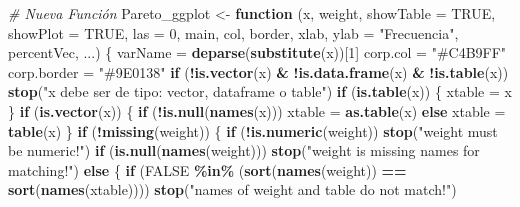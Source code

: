 \documentclass[
]{book}
\newenvironment{Shaded}{\begin{snugshade}}{\end{snugshade}}
\newcommand{\AttributeTok}[1]{\textcolor[rgb]{0.13,0.29,0.53}{#1}}
\newcommand{\CommentTok}[1]{\textcolor[rgb]{0.56,0.35,0.01}{\textit{#1}}}
\newcommand{\ConstantTok}[1]{\textcolor[rgb]{0.56,0.35,0.01}{#1}}
\newcommand{\ControlFlowTok}[1]{\textcolor[rgb]{0.13,0.29,0.53}{\textbf{#1}}}
\newcommand{\DecValTok}[1]{\textcolor[rgb]{0.00,0.00,0.81}{#1}}
\newcommand{\FunctionTok}[1]{\textcolor[rgb]{0.13,0.29,0.53}{\textbf{#1}}}
\newcommand{\NormalTok}[1]{#1}
\newcommand{\OtherTok}[1]{\textcolor[rgb]{0.56,0.35,0.01}{#1}}
\newcommand{\SpecialCharTok}[1]{\textcolor[rgb]{0.81,0.36,0.00}{\textbf{#1}}}
\newcommand{\StringTok}[1]{\textcolor[rgb]{0.31,0.60,0.02}{#1}}
\begin{document}
\begin{Shaded}
\begin{Highlighting}[]
\CommentTok{\# Nueva Función}
\NormalTok{Pareto\_ggplot }\OtherTok{\textless{}{-}} \ControlFlowTok{function}\NormalTok{ (x, weight, }\AttributeTok{showTable =} \ConstantTok{TRUE}\NormalTok{, }\AttributeTok{showPlot =} \ConstantTok{TRUE}\NormalTok{, }\AttributeTok{las =} \DecValTok{0}\NormalTok{, main, col, border, }
\NormalTok{                         xlab, }\AttributeTok{ylab =} \StringTok{"Frecuencia"}\NormalTok{, percentVec, ...) }
\NormalTok{\{}
\NormalTok{  varName }\OtherTok{=} \FunctionTok{deparse}\NormalTok{(}\FunctionTok{substitute}\NormalTok{(x))[}\DecValTok{1}\NormalTok{]}
\NormalTok{  corp.col }\OtherTok{=} \StringTok{"\#C4B9FF"}
\NormalTok{  corp.border }\OtherTok{=} \StringTok{"\#9E0138"}
  \ControlFlowTok{if}\NormalTok{ (}\SpecialCharTok{!}\FunctionTok{is.vector}\NormalTok{(x) }\SpecialCharTok{\&} \SpecialCharTok{!}\FunctionTok{is.data.frame}\NormalTok{(x) }\SpecialCharTok{\&} \SpecialCharTok{!}\FunctionTok{is.table}\NormalTok{(x)) }
    \FunctionTok{stop}\NormalTok{(}\StringTok{"x debe ser de tipo: vector, dataframe o table"}\NormalTok{)}
  \ControlFlowTok{if}\NormalTok{ (}\FunctionTok{is.table}\NormalTok{(x)) \{}
\NormalTok{    xtable }\OtherTok{=}\NormalTok{ x}
\NormalTok{  \}}
  \ControlFlowTok{if}\NormalTok{ (}\FunctionTok{is.vector}\NormalTok{(x)) \{}
    \ControlFlowTok{if}\NormalTok{ (}\SpecialCharTok{!}\FunctionTok{is.null}\NormalTok{(}\FunctionTok{names}\NormalTok{(x))) }
\NormalTok{      xtable }\OtherTok{=} \FunctionTok{as.table}\NormalTok{(x)}
    \ControlFlowTok{else}\NormalTok{ xtable }\OtherTok{=} \FunctionTok{table}\NormalTok{(x)}
\NormalTok{  \}}
  \ControlFlowTok{if}\NormalTok{ (}\SpecialCharTok{!}\FunctionTok{missing}\NormalTok{(weight)) \{}
    \ControlFlowTok{if}\NormalTok{ (}\SpecialCharTok{!}\FunctionTok{is.numeric}\NormalTok{(weight)) }
      \FunctionTok{stop}\NormalTok{(}\StringTok{"weight must be numeric!"}\NormalTok{)}
    \ControlFlowTok{if}\NormalTok{ (}\FunctionTok{is.null}\NormalTok{(}\FunctionTok{names}\NormalTok{(weight))) }
      \FunctionTok{stop}\NormalTok{(}\StringTok{"weight is missing names for matching!"}\NormalTok{)}
    \ControlFlowTok{else}\NormalTok{ \{}
      \ControlFlowTok{if}\NormalTok{ (}\ConstantTok{FALSE} \SpecialCharTok{\%in\%}\NormalTok{ (}\FunctionTok{sort}\NormalTok{(}\FunctionTok{names}\NormalTok{(weight)) }\SpecialCharTok{==} \FunctionTok{sort}\NormalTok{(}\FunctionTok{names}\NormalTok{(xtable)))) }
        \FunctionTok{stop}\NormalTok{(}\StringTok{"names of weight and table do not match!"}\NormalTok{)}

\end{Highlighting}
\end{Shaded}
\end{document}
